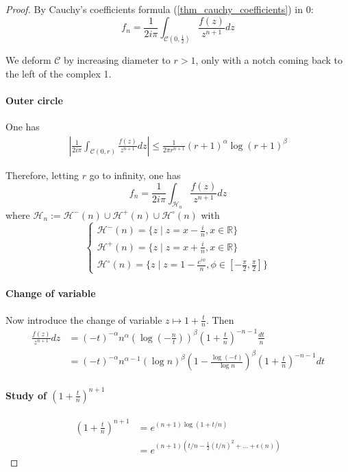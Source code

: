 \documentclass[../main.tex]{subfiles}
\begin{document}
\begin{proof}
	By Cauchy's coefficients formula (\ref{thm_cauchy_coefficients}) in 0:
	\[
	f_n = \frac{1}{2i\pi} \int_{\mathcal{C} (0, \frac{1}{2})} \frac{f(z)}{z^{n+1}} dz
	\]
	
	We deform $\mathcal{C}$ by increasing diameter to $r > 1$, only with a notch coming back to the left of the complex 1.
	
	
	\paragraph{Outer circle}
	One has
	\begin{align*}
		\left| \frac{1}{2i\pi} \int_{\mathcal{C}(0, r)} \frac{f(z)}{z^{n+1}} dz \right| \leq
		\frac{1}{2 \pi r^{n + 1}} {(r + 1)}^\alpha {\log (r + 1)}^\beta
	\end{align*}
	
	Therefore, letting $r$ go to infinity, one has
	\[
	f_n = \frac{1}{2i\pi} \int_{\mathcal{H}_n} \frac{f(z)}{z^{n+1}} dz
	\]
	where $\mathcal{H}_n := \mathcal{H}^-(n) \cup \mathcal{H}^+(n) \cup \mathcal{H}^\circ(n)$ with
	\begin{equation*}
		\begin{cases}
		\mathcal{H}^-(n) = \{z \mid z = x - \frac{i}{n}, x \in \mathbb{R} \}\\
		\mathcal{H}^+(n) = \{z \mid z = x + \frac{i}{n}, x \in \mathbb{R} \}\\
		\mathcal{H}^\circ(n) = \{z \mid z = 1 - \frac{e^{i \phi}}{n}, \phi \in [ - \frac{\pi}{2}, \frac{\pi}{2} ] \}
		\end{cases}
	\end{equation*}
	
	\paragraph{Change of variable}	
	Now introduce the change of variable $z \mapsto 1 + \frac{t}{n}$.
	Then
	\begin{align*}
	\frac{f(z)}{z^{n+1}} dz
	&= {(-t)}^{-\alpha} n^\alpha {\left( \log \left( - \frac{n}{t} \right) \right) }^\beta {\left( 1 + \frac{t}{n} \right)}^{-n-1} \frac{dt}{n}\\
	&= {(-t)}^{-\alpha} n^{\alpha-1} {(\log n)}^\beta {\left( 1 - \frac{\log (-t)}{\log n} \right)}^\beta  {\left( 1 + \frac{t}{n} \right)}^{-n-1} dt
	\end{align*}

	\paragraph{Study of $\left(1 + \frac{t}{n} \right)^{n+1}$}
	\begin{align*}
	\left(1 + \frac{t}{n} \right)^{n+1}
	&= e^{(n+1) \log ( 1 + t/n )}\\
	&= e^{(n+1) \left( t/n - \frac{1}{2} {(t/n)}^2 + \dots + \epsilon(n) \right)}
	\end{align*}
\end{proof}
\end{document}
